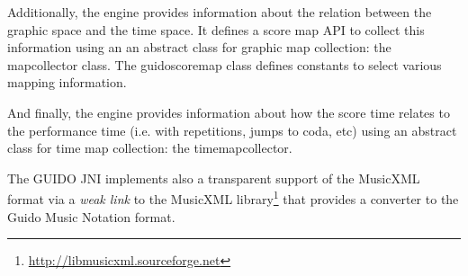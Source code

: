 \documentclass[a4paper]{article}
\begin{document}
Additionally, the engine provides information about the relation between the graphic space and the time space. 
It defines a score map API to collect this information using an an abstract class for graphic map collection: 
the mapcollector class. The guidoscoremap class defines constants to select various mapping information.

And finally, the engine provides information about how the score time relates to the performance time 
(i.e. with repetitions, jumps to coda, etc) using 
an abstract class for time map collection: the timemapcollector. 


The GUIDO JNI implements also a transparent support of the MusicXML format \cite{good01}\cite{Fober:04b} via a \emph{weak link} to the MusicXML library\footnote{\url{http://libmusicxml.sourceforge.net}} that provides a converter to the Guido Music Notation format. 


\newpage


\end{document}
